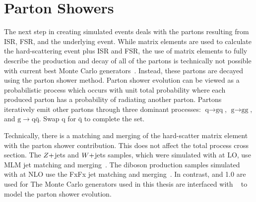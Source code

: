 \section{Parton Showers}
The next step in creating simulated events deals with the partons resulting from ISR,
FSR, and the underlying event. 
While matrix elements are used to calculate the hard-scattering event plus ISR and FSR, 
the use of matrix elements to fully describe the production and decay of all of the
partons is technically not possible with current best Monte Carlo generators~\cite{PhysRevD.94.074005}. 
Instead, these partons are decayed using the parton shower method. 
Parton shower evolution can be viewed as a probabilistic process 
which occurs with unit total probability where each produced parton has a probability
of radiating another parton. Partons iteratively emit other partons through three 
dominant processes: $\textrm{q} \to \textrm{gq}$, $\textrm{g} \to \textrm{gg}$, 
and $\textrm{g} \to \textrm{q}\bar{\textrm{q}}$. Swap $\textrm{q}$ for $\bar{\textrm{q}}$
to complete the set. 

Technically, there is a matching and merging of the hard-scatter matrix element with the
parton shower contribution. This does not affect the total process cross section.
The $Z+$jets and $W+$jets samples, which were simulated with \MGAMCNLO at LO, 
use MLM jet matching and merging~\cite{Alwall:2007fs}.
The diboson production samples simulated with \MGAMCNLO at NLO use the 
FxFx jet matching and merging~\cite{Frederix:2012ps}. 
In contrast,  and 1.0 are used for \ttbar
The Monte Carlo generators used in this thesis are interfaced with 
~\cite{Sjostrand:2014zea} to model the parton shower evolution.



